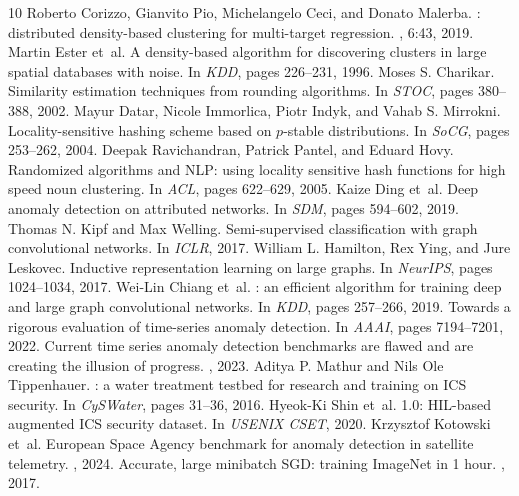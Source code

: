 \documentclass{article}
\begin{document}
{\footnotesize
\begin{thebibliography}{10}
\scriptsize
\setlength{\itemsep}{0pt}
\setlength{\parskip}{0pt}
\setlength{\parsep}{0pt}
Roberto Corizzo, Gianvito Pio, Michelangelo Ceci, and Donato Malerba.
: distributed density-based clustering for multi-target regression.
, 6:43, 2019.
Martin Ester et~al.
\newblock A density-based algorithm for discovering clusters in large spatial databases with noise.
\newblock In {\em KDD}, pages 226--231, 1996.
Moses S. Charikar.
\newblock Similarity estimation techniques from rounding algorithms.
\newblock In {\em STOC}, pages 380--388, 2002.
Mayur Datar, Nicole Immorlica, Piotr Indyk, and Vahab S. Mirrokni.
\newblock Locality-sensitive hashing scheme based on $p$-stable distributions.
\newblock In {\em SoCG}, pages 253--262, 2004.
Deepak Ravichandran, Patrick Pantel, and Eduard Hovy.
\newblock Randomized algorithms and {NLP}: using locality sensitive hash functions for high speed noun clustering.
\newblock In {\em ACL}, pages 622--629, 2005.
Kaize Ding et~al.
\newblock Deep anomaly detection on attributed networks.
\newblock In {\em SDM}, pages 594--602, 2019.
Thomas N. Kipf and Max Welling.
\newblock Semi-supervised classification with graph convolutional networks.
\newblock In {\em ICLR}, 2017.
William L. Hamilton, Rex Ying, and Jure Leskovec.
\newblock Inductive representation learning on large graphs.
\newblock In {\em NeurIPS}, pages 1024--1034, 2017.
Wei-Lin Chiang et~al.
: an efficient algorithm for training deep and large graph convolutional networks.
\newblock In {\em KDD}, pages 257--266, 2019.
\newblock Towards a rigorous evaluation of time-series anomaly detection.
\newblock In {\em AAAI}, pages 7194--7201, 2022.
\newblock Current time series anomaly detection benchmarks are flawed and are creating the illusion of progress.
, 2023.
Aditya P. Mathur and Nils Ole Tippenhauer.
: a water treatment testbed for research and training on {ICS} security.
\newblock In {\em CySWater}, pages 31--36, 2016.
Hyeok-Ki Shin et~al.
 1.0: {HIL}-based augmented {ICS} security dataset.
\newblock In {\em USENIX CSET}, 2020.
Krzysztof Kotowski et~al.
\newblock European {Space} {Agency} benchmark for anomaly detection in satellite telemetry.
, 2024.
\newblock Accurate, large minibatch {SGD}: training {ImageNet} in 1 hour.
, 2017.
\end{thebibliography}
}
\end{document}
